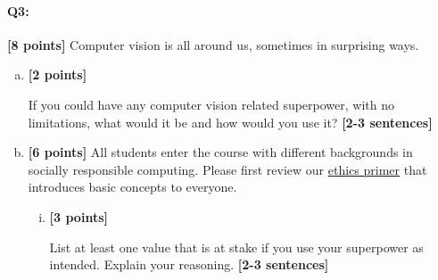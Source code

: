 \documentclass[11pt]{article}
\begin{document}

\pagebreak

\paragraph{Q3:} \textbf{[8 points]} Computer vision is all around us, sometimes in surprising ways.

\begin{enumerate}[(a)]
    \item 
\textbf{[2 points]} 
\begin{tcolorbox}[colback=orange!5!white,colframe=orange!75!black]
If you could have any computer vision related superpower, with no limitations, what would it be and how would you use it? \textbf{[2-3 sentences]}
\end{tcolorbox}




    \item \textbf{[6 points]}
All students enter the course with different backgrounds in socially responsible computing. Please first review our \href{https://browncsci1430.github.io/webpage/resources/ethics_primer/}{ethics primer} that introduces basic concepts to everyone.

    \begin{enumerate}[(i)]
    \item \textbf{[3 points]}
    \begin{tcolorbox}[colback=orange!5!white,colframe=orange!75!black]
    
    List at least one value that is at stake if you use your superpower as intended. Explain your reasoning. \textbf{[2-3 sentences]}
    \end{tcolorbox}
    
\end{enumerate}
\end{enumerate}
\end{document}
